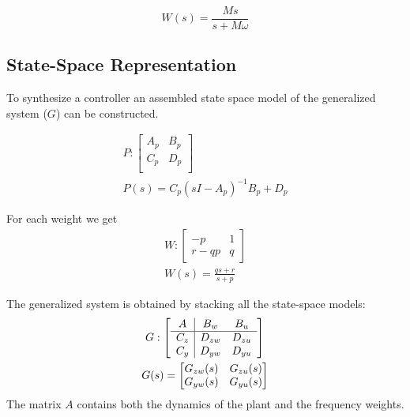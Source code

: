 \begin{equation*}
    W(s) = \frac{Ms}{s+M\omega}
\end{equation*}

\subsection{State-Space Representation}
To synthesize a controller an assembled state space model of the generalized system ($G$) can be constructed.

\begin{gather*}
    P : \left[
        \begin{array}{c|c} %
            A_p & B_p \\
            \hline %
            C_p & D_p \\
        \end{array}
        \right]                            \\
    P(s) = {C_p(sI-A_p)}^{-1}B_p+D_p
\end{gather*}


For each weight we get
\begin{gather*}
    W : \left[
        \begin{array}{c|c} %
            -p   & 1 \\
            \hline %
            r-qp & q
        \end{array}
        \right]                   \\
    W(s) = \frac{qs+r}{s+p}
\end{gather*}


The generalized system is obtained by stacking all the state-space models:
\begin{gather*}
    G : \left[
        \begin{array}{c|c c} %
            A   & B_w    & B_u    \\
            \hline %
            C_z & D_{zw} & D_{zu} \\
            C_y & D_{yw} & D_{yu}
        \end{array}
        \right]                        \\
    G(s) = \begin{bmatrix}
        G_{zw}(s) & G_{zu}(s) \\
        G_{yw}(s) & G_{yu}(s) \\
    \end{bmatrix}
\end{gather*}
The matrix $A$ contains both the dynamics of the plant and the frequency weights.

